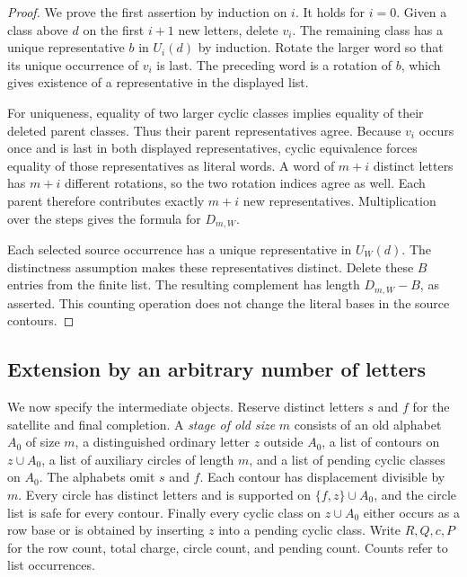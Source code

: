 \begin{proof}
We prove the first assertion by induction on $i$. It holds for $i=0$.
Given a class above $d$ on the first $i+1$ new letters, delete $v_i$.
The remaining class has a unique representative $b$ in $U_i(d)$ by
induction. Rotate the larger word so that its unique occurrence of $v_i$
is last. The preceding word is a rotation of $b$, which gives existence
of a representative in the displayed list.

For uniqueness, equality of two larger cyclic classes implies equality
of their deleted parent classes. Thus their parent representatives agree.
Because $v_i$ occurs once and is last in both displayed representatives,
cyclic equivalence forces equality of those representatives as literal
words. A word of $m+i$ distinct letters has $m+i$ different rotations,
so the two rotation indices agree as well. Each parent therefore
contributes exactly $m+i$ new representatives. Multiplication over the
steps gives the formula for $D_{m,W}$.

Each selected source occurrence has a unique representative in $U_W(d)$.
The distinctness assumption makes these representatives distinct. Delete
these $B$ entries from the finite list. The resulting complement has
length $D_{m,W}-B$, as asserted. This counting operation does not change
the literal bases in the source contours.
\end{proof}

\subsection{Extension by an arbitrary number of letters}

We now specify the intermediate objects. Reserve distinct letters $s$ and
$f$ for the satellite and final completion. A \emph{stage of old size}
$m$ consists of an old alphabet $A_0$ of size $m$, a distinguished
ordinary letter $z$ outside $A_0$, a list of contours on $z\cup A_0$,
a list of auxiliary circles of length $m$, and a list of pending cyclic
classes on $A_0$. The alphabets omit $s$ and $f$. Each contour has
displacement divisible by $m$. Every circle has distinct letters and is
supported on $\{f,z\}\cup A_0$, and the circle list is safe for every
contour. Finally every cyclic class on $z\cup A_0$ either occurs as a
row base or is obtained by inserting $z$ into a pending cyclic class.
Write $R,Q,c,P$ for the row count, total charge, circle count, and pending
count. Counts refer to list occurrences.

